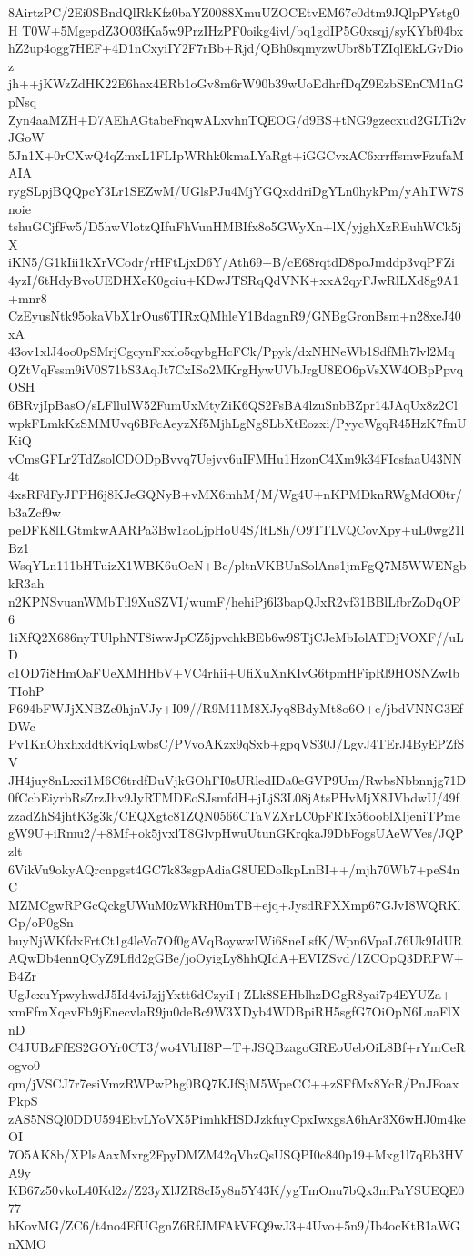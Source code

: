 8AirtzPC/2Ei0SBndQlRkKfz0baYZ0088XmuUZOCEtvEM67c0dtm9JQlpPYstg0H
T0W+5MgepdZ3O03fKa5w9PrzIHzPF0oikg4ivl/bq1gdIP5G0xsqj/syKYbf04bx
hZ2up4ogg7HEF+4D1nCxyiIY2F7rBb+Rjd/QBh0sqmyzwUbr8bTZIqlEkLGvDioz
jh++jKWzZdHK22E6hax4ERb1oGv8m6rW90b39wUoEdhrfDqZ9EzbSEnCM1nGpNsq
Zyn4aaMZH+D7AEhAGtabeFnqwALxvhnTQEOG/d9BS+tNG9gzecxud2GLTi2vJGoW
5Jn1X+0rCXwQ4qZmxL1FLIpWRhk0kmaLYaRgt+iGGCvxAC6xrrffsmwFzufaMAIA
rygSLpjBQQpcY3Lr1SEZwM/UGlsPJu4MjYGQxddriDgYLn0hykPm/yAhTW7Snoie
tshuGCjfFw5/D5hwVlotzQIfuFhVunHMBIfx8o5GWyXn+lX/yjghXzREuhWCk5jX
iKN5/G1kIii1kXrVCodr/rHFtLjxD6Y/Ath69+B/cE68rqtdD8poJmddp3vqPFZi
4yzI/6tHdyBvoUEDHXeK0gciu+KDwJTSRqQdVNK+xxA2qyFJwRlLXd8g9A1+mnr8
CzEyusNtk95okaVbX1rOus6TIRxQMhleY1BdagnR9/GNBgGronBsm+n28xeJ40xA
43ov1xlJ4oo0pSMrjCgcynFxxlo5qybgHcFCk/Ppyk/dxNHNeWb1SdfMh7lvl2Mq
QZtVqFssm9iV0S71bS3AqJt7CxISo2MKrgHywUVbJrgU8EO6pVsXW4OBpPpvqOSH
6BRvjIpBasO/sLFllulW52FumUxMtyZiK6QS2FsBA4lzuSnbBZpr14JAqUx8z2Cl
wpkFLmkKzSMMUvq6BFcAeyzXf5MjhLgNgSLbXtEozxi/PyycWgqR45HzK7fmUKiQ
vCmsGFLr2TdZsolCDODpBvvq7Uejvv6uIFMHu1HzonC4Xm9k34FIcsfaaU43NN4t
4xsRFdFyJFPH6j8KJeGQNyB+vMX6mhM/M/Wg4U+nKPMDknRWgMdO0tr/b3aZcf9w
peDFK8lLGtmkwAARPa3Bw1aoLjpHoU4S/ltL8h/O9TTLVQCovXpy+uL0wg21lBz1
WsqYLn111bHTuizX1WBK6uOeN+Bc/pltnVKBUnSolAns1jmFgQ7M5WWENgbkR3ah
n2KPNSvuanWMbTil9XuSZVI/wumF/hehiPj6l3bapQJxR2vf31BBlLfbrZoDqOP6
1iXfQ2X686nyTUlphNT8iwwJpCZ5jpvchkBEb6w9STjCJeMbIolATDjVOXF//uLD
c1OD7i8HmOaFUeXMHHbV+VC4rhii+UfiXuXnKIvG6tpmHFipRl9HOSNZwIbTIohP
F694bFWJjXNBZc0hjnVJy+I09//R9M11M8XJyq8BdyMt8o6O+c/jbdVNNG3EfDWc
Pv1KnOhxhxddtKviqLwbsC/PVvoAKzx9qSxb+gpqVS30J/LgvJ4TErJ4ByEPZfSV
JH4juy8nLxxi1M6C6trdfDuVjkGOhFI0sURledIDa0eGVP9Um/RwbsNbbnnjg71D
0fCcbEiyrbRsZrzJhv9JyRTMDEoSJsmfdH+jLjS3L08jAtsPHvMjX8JVbdwU/49f
zzadZhS4jhtK3g3k/CEQXgtc81ZQN0566CTaVZXrLC0pFRTx56ooblXljeniTPme
gW9U+iRmu2/+8Mf+ok5jvxlT8GlvpHwuUtunGKrqkaJ9DbFogsUAeWVes/JQPzlt
6VikVu9okyAQrcnpgst4GC7k83sgpAdiaG8UEDoIkpLnBI++/mjh70Wb7+peS4nC
MZMCgwRPGcQckgUWuM0zWkRH0mTB+ejq+JysdRFXXmp67GJvI8WQRKlGp/oP0gSn
buyNjWKfdxFrtCt1g4leVo7Of0gAVqBoywwIWi68neLsfK/Wpn6VpaL76Uk9IdUR
AQwDb4ennQCyZ9Lfld2gGBe/joOyigLy8hhQIdA+EVIZSvd/1ZCOpQ3DRPW+B4Zr
UgJcxuYpwyhwdJ5Id4viJzjjYxtt6dCzyiI+ZLk8SEHblhzDGgR8yai7p4EYUZa+
xmFfmXqevFb9jEnecvlaR9ju0deBc9W3XDyb4WDBpiRH5sgfG7OiOpN6LuaFlXnD
C4JUBzFfES2GOYr0CT3/wo4VbH8P+T+JSQBzagoGREoUebOiL8Bf+rYmCeRogvo0
qm/jVSCJ7r7esiVmzRWPwPhg0BQ7KJfSjM5WpeCC++zSFfMx8YcR/PnJFoaxPkpS
zAS5NSQl0DDU594EbvLYoVX5PimhkHSDJzkfuyCpxIwxgsA6hAr3X6wHJ0m4keOI
7O5AK8b/XPlsAaxMxrg2FpyDMZM42qVhzQsUSQPI0c840p19+Mxg1l7qEb3HVA9y
KB67z50vkoL40Kd2z/Z23yXlJZR8cI5y8n5Y43K/ygTmOnu7bQx3mPaYSUEQE077
hKovMG/ZC6/t4no4EfUGgnZ6RfJMFAkVFQ9wJ3+4Uvo+5n9/Ib4ocKtB1aWGnXMO

